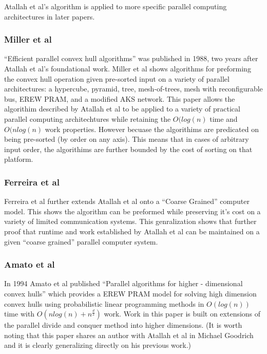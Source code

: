 \documentclass[10pt,a4paper]{report}
\begin{document}

Atallah et al's algorithm is applied to more specific parallel computing architectures in later papers.



\subsubsection{Miller et al}

``Efficient parallel convex hull algorithms''\cite{Russ1988Efficient} was published in 1988, two years after Atallah et al's\cite{Atallah1986Efficient} foundational work.
Miller et al\cite{Russ1988Efficient} shows algorithms for preforming the convex hull operation given pre-sorted input on a variety of parallel architectures: a hypercube, pyramid,
tree, mesh-of-trees, mesh with reconfigurable bus, EREW PRAM, and a modified AKS network.
This paper allows the algorithim described by Atallah et al\cite{Atallah1986Efficient} to be applied to a variety of practical parallel computing architechtures while retaining the $O(log(n)$ time and $O(nlog(n)$ work properties. However becuase the algorithims are predicated on being pre-sorted (by order on any axis). This means that in cases of arbitrary input order, the algorithims are further bounded by the cost of sorting on that platform.


\subsubsection{Ferreira et al}

Ferreira et al\cite{Mohamadou1999Scalable} further extends Atallah et al onto a ``Coarse Grained'' computer model. This shows the algorithm can be preformed while preserving it's cost on a variety of limited communication systems. This genralization shows that further proof that runtime and work established by Atallah et al can be maintained on a given ``coarse grained'' parallel computer system.



\subsubsection{Amato et al}

In 1994 Amato et al published ``Parallel algorithms for higher - dimensional convex hulls''\cite{NancyParallel} which provides a EREW PRAM model for solving high dimension convex hulls using probabilistic linear programming methods in $O(log(n))$ time with $O(nlog(n)+n^{\frac{d}{2}})$ work.
Work in this paper is built on extensions of the parallel divide and conquer method into higher dimensions. (It is worth noting that this paper shares an author with Atallah et al in Michael Goodrich and it is clearly generalizing directly on his previous work.)
\end{document}
